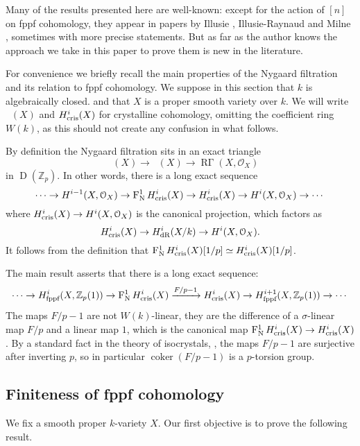 \documentclass[11pt]{article}
\theoremstyle{plain}
\theoremstyle{definition}
\theoremstyle{remark}
\numberwithin{equation}{section}
\newcommand{\ssec}[2]{\subsection{#2}\label{SubS:#1}}
\newcommand\calO{\mathcal{O}}
\newcommand{\Zp}{\mathbb{Z}_p}
\newcommand\xto[2]{\xrightarrow[#1]{#2}}
\DeclareMathOperator{\coker}{coker}
\DeclareMathOperator{\D}{D}                                              %
\DeclareMathOperator{\Rgam}{\text{R}\Gamma}                              %
\newcommand{\W}{W}                                                       %
\newcommand\Hflat[1]{H^{#1}_{\textnormal{fppf}}}                         %
\newcommand\HdR[1]{H^{#1}_{\textnormal{dR}}}                             %
\DeclareMathOperator{\Rcris}{R\Gamma_{cris}}                             %
\DeclareMathOperator{\Nyg}{F_N^1}                                      %
\newcommand\Hcris[1]{H^{#1}_{\textnormal{cris}}}                         %
\begin{document}
Many of the results presented here are well-known: except for the action of $[n]$ on fppf cohomology, they appear in papers by Illusie \cite{illusiedrw}, Illusie-Raynaud \cite{illusieraynaud} and Milne \cite{milnezeta}, sometimes with more precise statements. But as far as the author knows the approach we take in this paper to prove them is new in the literature.

For convenience we briefly recall the main properties of the Nygaard filtration and its relation to fppf cohomology. We suppose in this section that $k$ is algebraically closed. and that $X$ is a proper smooth variety over $k$. We will write $\Rcris(X)$ and $\Hcris{i}(X)$ for crystalline cohomology, omitting the coefficient ring $\W(k)$, as this should not create any confusion in what follows.

By definition the Nygaard filtration sits in an exact triangle
\begin{equation}\label{triangoloagain}
\Nyg{}\Rcris(X)\to\Rcris(X)\to\Rgam(X,\calO_X)
\end{equation}
in $\D(\Zp)$. In other words, there is a long exact sequence
\begin{equation}\label{sel2}
	\cdots \to {H^{i-1}(X,\calO_X)} \to {\Nyg\Hcris{i}(X)} \to {\Hcris{i}(X)} \to {H^i(X,\calO_X)} \to \cdots
\end{equation}
where ${\Hcris{i}(X)} \to {H^i(X,\calO_X)}$ is the canonical projection, which factors as 
\[
\Hcris{i}(X)\to\HdR{i}(X/k)\to H^{i}(X,\calO_X).
\]
It follows from the definition that $\Nyg{}\Hcris{i}(X)[1/p]\simeq\Hcris{i}(X)[1/p]$. 

The main result  asserts that there is a long exact sequence:
\begin{equation}\label{sel1}
	\cdots\to{\Hflat{i}(X,\Zp(1))}\to{\Nyg\Hcris{i}(X)}\xto{}{F/p-1}{\Hcris{i}(X)}\to{\Hflat{i+1}(X,\Zp(1))}\to\cdots
\end{equation}
The maps $F/p-1$ are not $\W(k)$-linear, they are the difference of a $\sigma$-linear map $F/p$ and a linear map $1$, which is the canonical map $\Nyg\Hcris{i}(X)\to\Hcris{i}(X)$. By a standard fact in the theory of isocrystals, \cite[II.5.A.5.3]{illusiedrw}, the maps $F/p-1$ are surjective after inverting $p$, so in particular $\coker(F/p-1)$ is a $p$-torsion group.


\ssec{sezionefinitezza}{Finiteness of fppf cohomology}

We fix a smooth proper $k$-variety $X$. Our first objective is to prove the following result.
\end{document}
